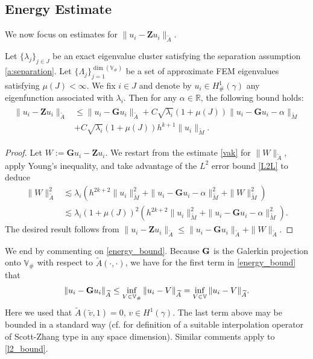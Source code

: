 \documentclass{siamart0516}
\newcommand{\bG}{\ensuremath{\boldsymbol G}}
\newcommand{\bZ}{\ensuremath{\boldsymbol Z}}
\numberwithin{equation}{section}
\numberwithin{theorem}{section}
\numberwithin{figure}{section}
\begin{document}
\subsection{Energy Estimate}
We now focus on estimates for  $\| u_i- \bZ u_i\|_{\widetilde A}$.
\begin{theorem}\label{t:energy}
Let $\{\lambda_j\}_{j\in J}$ be an exact eigenvalue cluster satisfying the separation assumption \eqref{a:separation}. Let $\{\Lambda_{j}\}_{j=1}^{\dim (\mathbb{V}_\#)}$ be a set of approximate FEM eigenvalues satisfying $\mu(J)<\infty$.
We fix $i \in J$ and denote by $u_i \in H^1_\#(\gamma)$ any eigenfunction associated with $\lambda_i$.
Then for any $\alpha \in \mathbb{R}$, the following bound holds:
\begin{align}
\label{energy_bound}
\begin{aligned}
\| u_i- \bZ u_i\|_{\widetilde A}&\leq \|u_i - \bG u_i\|_{\widetilde A} + C \sqrt{\lambda_i} (1+\mu(J)) \|u_i- \bG u_i-\alpha\|_{\widetilde M}\\
&+ C \sqrt{\lambda_i} (1+\mu(J)) h^{k+1} \|u_i\|_{\widetilde M}. 
\end{aligned}
\end{align}

\end{theorem}	

\begin{proof}
Let $W := \bG u_i - \bZ u_i$.  We restart from the estimate  \eqref{vak} for $\| W \|_{\widetilde A}$, apply Young's inequality, and take advantage of the $L^2$ error bound \eqref{L2L} to deduce
$$
\begin{aligned}
\|W\|_{\widetilde A}^2  & \lesssim   \lambda_i ( h^{2k+2}\|u_i\|_{\widetilde M}^2 + \|u_i-{\bG} u_i-\alpha\|_{\widetilde M}^2 + \|W\|_{\widetilde M}^2)
\\ & \lesssim  \lambda_i (1+\mu(J))^2 (h^{2k+2}\|u_i\|_{\widetilde M}^2 + \|u_i-{\bG} u_i-\alpha\|_{\widetilde M}^2).  
\end{aligned}
$$
The desired result follows from 
$\|u_i-\bZ u_i\|_{\widetilde A} \leq \|u_i-\bG u_i\|_{\widetilde A} +\|W\|_{\widetilde A}.$
\end{proof}	



We end by commenting on \eqref{energy_bound}.  Because ${\bf G}$ is the Galerkin projection onto $\mathbb{V}_\#$ with respect to $\widetilde A(\cdot, \cdot)$, we have for the first term in \eqref{energy_bound} that
\begin{align}
\|u_i-{\bf G}u_i\|_{\widetilde A}  \le \inf_{V \in \mathbb{V}_\#} \|u_i-V\|_{\widetilde A} %
= \inf_{V \in \mathbb{V}} \|u_i-V \|_{\widetilde A}.
\end{align}
Here we used that $\widetilde A(\tilde v,1)=0$, $v \in H^1(\gamma)$.
The last term above may be bounded in a standard way (cf. \cite{CD15} for definition of a suitable interpolation operator of Scott-Zhang type in any space dimension).  Similar comments apply to \eqref{l2_bound}.
\end{document}
